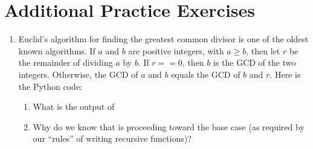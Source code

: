 \documentclass[letterpaper,10pt,english]{sphinxmanual}
\begin{document}
\section{Additional Practice Exercises}
\label{\detokenize{lecture_notes/lec23_recursion:additional-practice-exercises}}\begin{enumerate}
\item {} 
Euclid’s algorithm for finding the greatest common divisor is one of
the oldest known algorithms. If \(a\) and \(b\) are positive
integers, with \(a \geq b\), then let \(r\) be the remainder
of dividing \(a\) by \(b\). If \(r == 0\), then \(b\)
is the GCD of the two integers. Otherwise, the GCD of \(a\) and
\(b\) equals the GCD of \(b\) and \(r\). Here is the
Python code:

%
\begin{sphinxVerbatim}[commandchars=\\\{\}]
 
       
          

        
     
         
         
\end{sphinxVerbatim}
\begin{enumerate}
\item {} 
What is the output of

%
\begin{sphinxVerbatim}[commandchars=\\\{\}]
\end{sphinxVerbatim}

\item {} 
Why do we know that  is proceeding toward the base case (as
required by our “rules” of writing recursive functions)?

\end{enumerate}


\end{enumerate}
\end{document}

